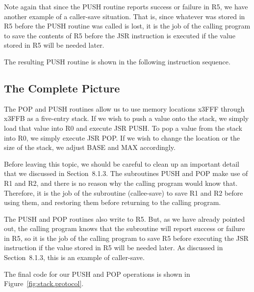 \documentclass{patt}
\begin{document}
Note again that since the PUSH routine reports success or failure in
R5, we have another example of a caller-save situation. That is, since
whatever was stored in R5 before the PUSH routine was called is lost,
it is the job of the calling program to save the contents of R5 before
the JSR instruction is executed if the value stored in R5 will be needed
later.

The resulting PUSH routine is shown in the following instruction sequence.  


\subsection{The Complete Picture}

The POP and PUSH routines allow us to use memory locations x3FFF
through x3FFB as a five-entry stack. If we wish to push a value onto
the stack, we simply load that value into R0 and execute JSR PUSH. To
pop a value from the stack into R0, we simply execute JSR POP. If we
wish to change the location or the size of the stack, we adjust BASE
and MAX accordingly.

Before leaving this topic, we should be careful to clean up an important 
detail that we discussed in Section~8.1.3.  The subroutines PUSH and POP 
make use of R1 and R2, and there is no reason why the calling program would
know that.  Therefore,   it is the job of the subroutine (callee-save) to 
save R1 and R2 before using them, and restoring them before returning to 
the calling program.  

The PUSH and POP routines also write to R5.  But, as we have already pointed 
out, the calling program knows that the subroutine will report success or 
failure
in R5, so it is the job of the calling program to save R5 before executing the
JSR instruction if the value stored in R5 will be needed later.  As discussed
in Section~8.1.3, this is an example of caller-save.

The final code for our PUSH and POP operations is shown in
Figure~\ref{fig:stack.protocol}.
\end{document}
